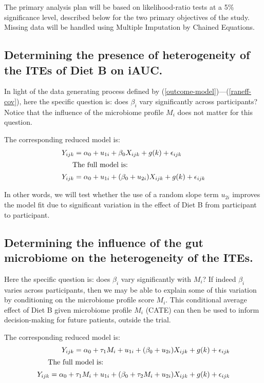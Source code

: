 \documentclass[12pt]{article}
\begin{document}
The primary analysis plan will be based on likelihood-ratio tests at a 5\% significance level, described below for the two primary objectives of the study. Missing data will be handled using Multiple Imputation by Chained Equations.

\subsection{Determining the presence of heterogeneity of the ITEs of Diet B on iAUC.}
\label{primary-analysis1}
In light of the data generating process defined by (\ref{outcome-model})---(\ref{raneff-cov}), here the specific question is: does $\beta_i$ vary significantly across participants? Notice that the influence of the microbiome profile $M_i$ does not matter for this question.

The corresponding reduced model is:
\begin{align}
    Y_{ijk} &= \alpha_0 + u_{1i} + \beta_0 X_{ijk} + g(k) + \epsilon_{ijk}\label{primary-reduced-model}\\
\intertext{\indent The full model is:}
   Y_{ijk} &= \alpha_0 + u_{1i} + (\beta_0 + u_{2i}) X_{ijk} + g(k) + \epsilon_{ijk}\label{primary-full-model}
\end{align}

In other words, we will test whether the use of a random slope term $u_{2i}$ improves the model fit due to significant variation in the effect of Diet B from participant to participant.
\subsection{Determining the influence of the gut microbiome on the heterogeneity of the ITEs.}
\label{primary-analysis2}
Here the specific question is: does $\beta_i$ vary significantly with $M_i$? If indeed $\beta_i$ varies across participants, then we may be able to explain some of this variation by conditioning on the microbiome profile score $M_i$. This conditional average effect of Diet B given microbiome profile $M_i$ (CATE) can then be used to inform decision-making for future patients, outside the trial.

The corresponding reduced model is:
\begin{align}
    Y_{ijk} = \alpha_0 + \tau_1 M_i + u_{1i} + (\beta_0 + u_{2i}) X_{ijk} + g(k) + \epsilon_{ijk}\label{primary2-reduced-model}\\
\intertext{\indent The full model is:}
    Y_{ijk} = \alpha_0 + \tau_1 M_i + u_{1i} + (\beta_0 + \tau_2 M_i+ u_{2i}) X_{ijk} + g(k) + \epsilon_{ijk}\label{primary2-full-model}
\end{align}
\end{document}
